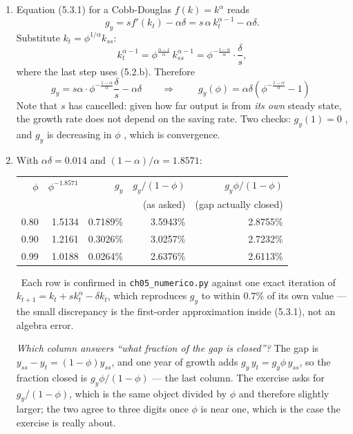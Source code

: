 \documentclass[12pt, letterpaper]{article}
\begin{document}
\begin{tcolorbox}[evenbox,title={Problem 5.2 \quad The Speed of Convergence}]
\begin{enumerate}
\item Equation (5.3.1) for a Cobb-Douglas $f(k)=k^{\alpha}$ reads
\[
g_y = s f'(k_t)-\alpha\delta = s\,\alpha\,k_t^{\alpha-1}-\alpha\delta .
\]
Substitute $k_t=\phi^{1/\alpha}k_{ss}$:
\[
k_t^{\alpha-1}=\phi^{\frac{\alpha-1}{\alpha}}\,k_{ss}^{\alpha-1}
=\phi^{-\frac{1-\alpha}{\alpha}}\cdot\frac{\delta}{s},
\]
where the last step uses (5.2.b). Therefore
\[
g_y=s\alpha\cdot\phi^{-\frac{1-\alpha}{\alpha}}\frac{\delta}{s}-\alpha\delta
\qquad\Longrightarrow\qquad
\boxed{\;g_y(\phi)=\alpha\delta\left(\phi^{-\frac{1-\alpha}{\alpha}}-1\right)\;}
\]
Note that $s$ has cancelled: given how far output is from \emph{its own} steady state, the
growth rate does not depend on the saving rate. Two checks: $g_y(1)=0$ \checkmark, and
$g_y$ is decreasing in $\phi$ \checkmark, which is convergence.

\item With $\alpha\delta=0.014$ and $(1-\alpha)/\alpha=1.8571$:

\begin{center}
\begin{tabular}{@{}rrrrr@{}}
\toprule
$\phi$ & $\phi^{-1.8571}$ & $g_y$ & $g_y/(1-\phi)$ & $g_y\phi/(1-\phi)$ \\
       &                  &       & (as asked)     & (gap actually closed) \\
\midrule
0.80 & 1.5134 & 0.7189\% & 3.5943\% & 2.8755\% \\
0.90 & 1.2161 & 0.3026\% & 3.0257\% & 2.7232\% \\
0.99 & 1.0188 & 0.0264\% & 2.6376\% & 2.6113\% \\
\bottomrule
\end{tabular}
\end{center}
\checkmark\ Each row is confirmed in \texttt{ch05\_numerico.py} against one exact iteration of
$k_{t+1}=k_t+sk_t^{\alpha}-\delta k_t$, which reproduces $g_y$ to within $0.7\%$ of its own
value --- the small discrepancy is the first-order approximation inside (5.3.1), not an
algebra error.

\smallskip
\emph{Which column answers ``what fraction of the gap is closed''?} The gap is
$y_{ss}-y_t=(1-\phi)y_{ss}$, and one year of growth adds $g_y\,y_t=g_y\phi\,y_{ss}$, so the
fraction closed is $g_y\phi/(1-\phi)$ --- the last column. The exercise asks for
$g_y/(1-\phi)$, which is the same object divided by $\phi$ and therefore slightly larger;
the two agree to three digits once $\phi$ is near one, which is the case the exercise is
really about.


\end{enumerate}
\end{tcolorbox}
\end{document}
